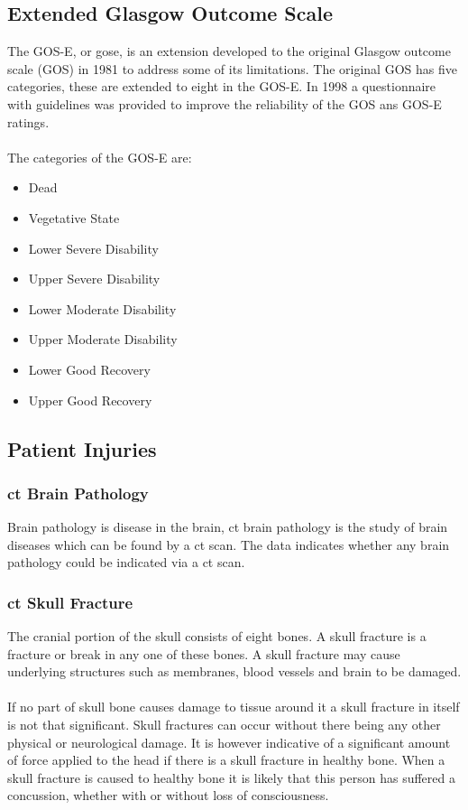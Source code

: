 \documentclass[11pt]{article}
\begin{document}
\subsection{Extended Glasgow Outcome Scale}
The GOS-E, or \gls{gose}, is an extension developed to the original Glasgow outcome scale (GOS) in 1981 to address some of its limitations. The original GOS has five categories, these are extended to eight in the GOS-E. In 1998 a questionnaire with guidelines was provided to improve the reliability of the GOS ans GOS-E ratings\cite{GOSEExtendedGlasgow}.\cite{sanderExtendedGlasgowOutcome2002}\\
\\
The categories of the GOS-E are:
\begin{itemize}
  \item{Dead}
  \item{Vegetative State}
  \item{Lower Severe Disability}
  \item{Upper Severe Disability}
  \item{Lower Moderate Disability}
  \item{Upper Moderate Disability}
  \item{Lower Good Recovery}
  \item{Upper Good Recovery}
\end{itemize}

\subsection{Patient Injuries}

\subsubsection{\gls{ct} Brain Pathology}
Brain pathology is disease in the brain, \gls{ct} brain pathology is the study of brain diseases which can be found by a \gls{ct} scan.
The data indicates whether any brain pathology could be indicated via a \gls{ct} scan.\cite{BrainPathologyDefinition}

\subsubsection{\gls{ct} Skull Fracture}
The cranial portion of the skull consists of eight bones. A skull fracture is a fracture or break in any one of these bones. A skull fracture may cause underlying structures such as membranes, blood vessels and brain to be damaged.\cite{SkullFracture2020}\\
\\
If no part of skull bone causes damage to tissue around it a skull fracture in itself is not that significant. Skull fractures can occur without there being any other physical or neurological damage. It is however indicative of a significant amount of force applied to the head if there is a skull fracture in healthy bone. When a skull fracture is caused to healthy bone it is likely that this person has suffered a concussion, whether with or without loss of consciousness.\cite{SkullFracture2020}
\end{document}
